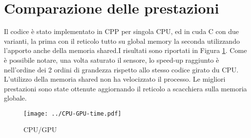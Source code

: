 \documentclass[a4paper,12pt]{article}
\begin{document}
\section{Comparazione delle prestazioni}
Il codice è stato implementato in CPP per singola CPU, ed in cuda C con due varianti, la prima con il reticolo tutto su global memory la seconda utilizzando l'apporto anche della memoria shared.I risultati sono riportati in Figura \ref{figura:time}. Come è possibile notare, una volta saturato il sensore, lo speed-up raggiunto è nell'ordine dei 2 ordini di grandezza rispetto allo stesso codice girato du CPU. L'utilizzo della memoria shared non ha velocizzato il processo. Le migliori prestazioni sono state ottenute aggiornando il reticolo a scacchiera sulla memoria globale.
\begin{figure}
	\centering
	\texttt{[image: ../CPU-GPU-time.pdf]}
	\caption{CPU/GPU}
	\label{figura:time}
\end{figure}
\end{document}
